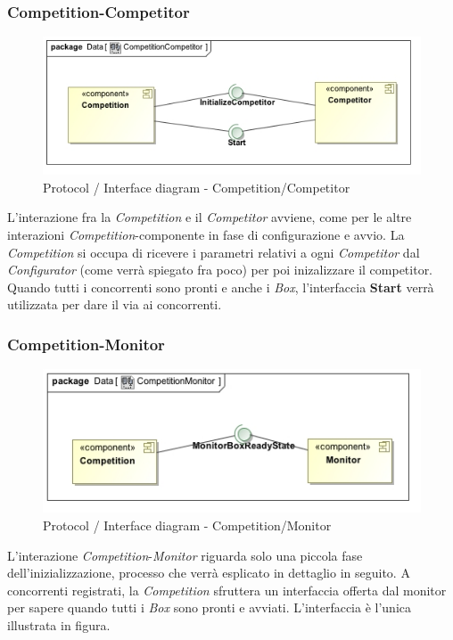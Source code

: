 \subsubsection{Competition-Competitor}
\begin{center}
\begin{figure}[h!]
	\includegraphics[scale=0.55]{img/InteractionDiagram/Implementation_Diagram__CompetitionCompetitor.jpg}
\caption{Protocol / Interface diagram - Competition/Competitor}
\end{figure}
\end{center}
L'interazione fra la \emph{Competition} e il \emph{Competitor} avviene, come per le altre interazioni \emph{Competition}-componente in fase di configurazione
e avvio. La \emph{Competition} si occupa di ricevere i parametri relativi a ogni \emph{Competitor} dal \emph{Configurator} (come verr\`{a} spiegato fra poco) per 
poi inizalizzare il competitor. Quando tutti i concorrenti sono pronti e anche i \emph{Box}, l'interfaccia \textbf{Start} verr\`{a} utilizzata per dare il
via ai concorrenti.
\subsubsection{Competition-Monitor}
\begin{center}
\begin{figure}[h!]
	\includegraphics[scale=0.55]{img/InteractionDiagram/Implementation_Diagram__CompetitionMonitor.jpg}
\caption{Protocol / Interface diagram - Competition/Monitor}
\end{figure}
\end{center}
L'interazione \emph{Competition}-\emph{Monitor} riguarda solo una piccola fase dell'inizializzazione, processo che verr\`{a} esplicato in dettaglio in seguito.
A concorrenti registrati, la \emph{Competition} sfruttera un interfaccia offerta dal monitor per sapere quando tutti i \emph{Box} sono pronti e avviati.
L'interfaccia \`{e} l'unica illustrata in figura.
